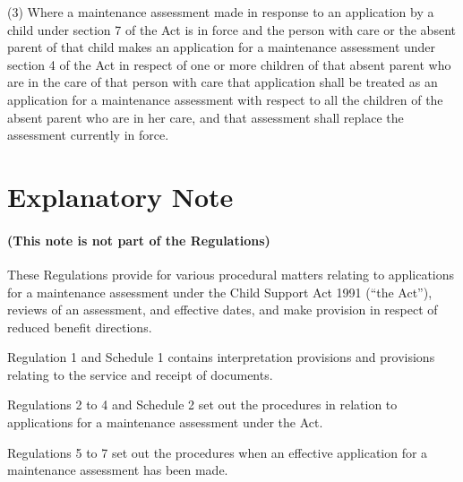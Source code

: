 \documentclass[a4paper,12pt]{article}
\begin{document}
(3) Where a maintenance assessment made in response to an application by a child under section 7 of the Act is in force and the person with care 
or the absent parent  %
of that child makes an application for a maintenance assessment under section 4 of the Act in respect of 
one or more 
  children of that absent parent who are in the care of that person with care  %
that application shall be treated as an application for a maintenance assessment with respect to all the children of the absent parent who are in her care, and %
that assessment shall replace the assessment currently in force.


\part{Explanatory Note}

\renewcommand\parthead{--- Explanatory Note}

\subsection*{(This note is not part of the Regulations)}

 These Regulations provide for various procedural matters relating to applications for a maintenance assessment under the Child Support Act 1991 (“the Act”), reviews of an assessment, and effective dates, and make provision in respect of reduced benefit directions.

  Regulation 1 and Schedule 1 contains interpretation provisions and provisions relating to the service and receipt of documents.

  Regulations 2 to 4 and Schedule 2 set out the procedures in relation to applications for a maintenance assessment under the Act.

  Regulations 5 to 7 set out the procedures when an effective application for a maintenance assessment has been made.
\end{document}
